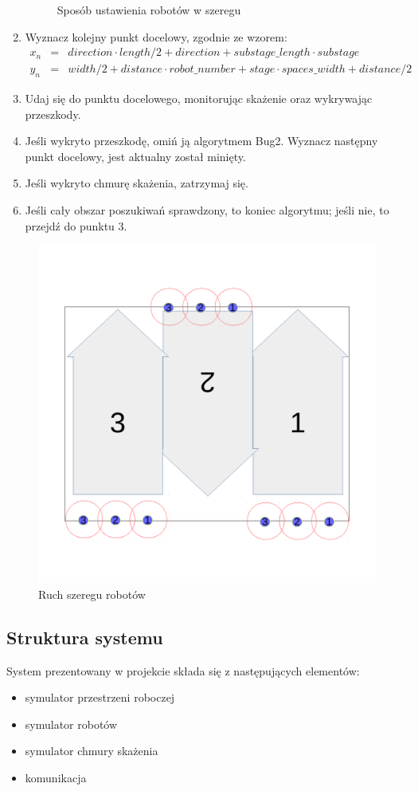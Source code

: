 \documentclass[a4paper, 12pt]{article}
\begin{document}
\begin{enumerate}
\begin{figure}[h!]
			\caption{Sposób ustawienia robotów w szeregu}
			\label{odleglosci}
		\end{figure}
		\item Wyznacz kolejny punkt docelowy, zgodnie ze wzorem:
		\begin{eqnarray}
		x_n &=& direction \cdot length / 2 + direction + substage\_length \cdot substage\nonumber\\
		y_n &=& width / 2 + distance \cdot robot\_number + stage \cdot spaces\_width + distance / 2\nonumber
		\end{eqnarray}
		\item Udaj się do punktu docelowego, monitorując skażenie oraz wykrywając przeszkody.
		\item Jeśli wykryto przeszkodę, omiń ją algorytmem Bug2. Wyznacz następny punkt docelowy, jest aktualny został minięty.
		\item Jeśli wykryto chmurę skażenia, zatrzymaj się.
		\item Jeśli cały obszar poszukiwań sprawdzony, to koniec algorytmu; jeśli nie, to przejdź do punktu 3.
		\end{enumerate}
		\begin{figure}[h!]
			\centering
			\includegraphics*[width=0.7\columnwidth]{img/ruch.pdf}
			\caption{Ruch szeregu robotów}
			\label{ruch}
		\end{figure}
		
	
	\subsection{Struktura systemu}
	System prezentowany w projekcie składa się z następujących elementów:
	\begin{itemize}
	\item symulator przestrzeni roboczej	
	\item symulator robotów
	\item symulator chmury skażenia	
	\item komunikacja
	\end{itemize}
	
\end{document}
